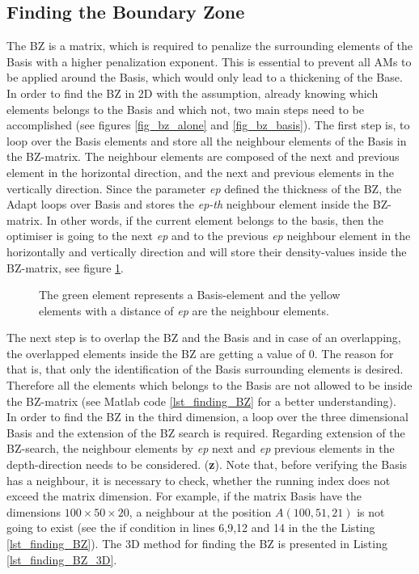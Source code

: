 \subsection{Finding the \textbf{Boundary Zone}}
\label{subsectin_find_BZ}
The BZ is a matrix, which
is required to penalize the surrounding elements of the Basis with a higher
penalization exponent. This is essential to prevent all AMs to be 
applied around the Basis, which would only lead to a thickening of
the Base. 
In order to find the BZ in 2D with the assumption,
 already knowing which elements belongs to the Basis and which not, 
 two main steps need to be accomplished 
 (see figures \ref{fig_bz_alone} and \ref{fig_bz_basis}). 
The first step is, to loop over the Basis 
elements and store all the neighbour 
elements of the Basis in the BZ-matrix. 
The neighbour elements are  composed of 
the next and previous element in the horizontal 
direction, and the next and previous elements in the vertically
 direction. Since the parameter
  \emph{ep} defined the thickness of the BZ,
  the Adapt loops over Basis and stores the \emph{ep-th} neighbour
   element inside the BZ-matrix. In other words,
    if the current element belongs to the basis, then
     the optimiser is going to the next \emph{ep}  
     and to the previous \emph{ep} neighbour element 
     in the horizontally and vertically direction and will store their density-values inside the BZ-matrix, see figure \ref{fig_find_BZ_2D}. \\

\begin{figure}[!h]
 \centering
 \def\svgwidth{0.45\textwidth}
 
 \caption{The green element represents a Basis-element and the yellow elements with a distance of \emph{ep} are the neighbour elements. }  
 \label{fig_find_BZ_2D}          %
\end{figure}

The next step is to overlap the BZ and the Basis and in case of an overlapping, 
the overlapped elements inside the BZ are 
getting a value of 0. The reason for that is, that 
 only the identification of the Basis surrounding elements is desired. 
 Therefore all
 the elements which belongs to the Basis are not 
 allowed to be inside the BZ-matrix (see Matlab code \ref{lst_finding_BZ} for a better understanding).\\

In order to find the BZ in the third dimension, 
a loop over the three dimensional Basis and the extension of the BZ search
is required. Regarding extension of the BZ-search, the
 neighbour elements by \emph{ep} next and \emph{ep}  previous 
 elements in the depth-direction needs to be considered.
(\textbf{z}). Note that, before verifying the
 Basis has a neighbour, it is necessary to check, 
 whether the running index does not exceed the 
 matrix dimension. For example, if the matrix 
 Basis have the dimensions $100 \times 50 \times 20$, a
  neighbour at the position $A(100,51,21)$ is not going 
  to exist (see the if condition in lines 6,9,12 and 
  14 in the the Listing \ref{lst_finding_BZ}).
  The 3D method for finding the BZ is presented in
   Listing \ref{lst_finding_BZ_3D}. \\

